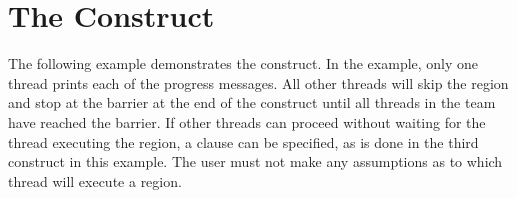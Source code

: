 \pagebreak
\chapter{The  Construct}
\label{chap:single}

The following example demonstrates the  construct. In the example, 
only one thread prints each of the progress messages. All other threads will skip 
the  region and stop at the barrier at the end of the  
construct until all threads in the team have reached the barrier. If other threads 
can proceed without waiting for the thread executing the  region, 
a  clause can be specified, as is done in the third  
construct in this example. The user must not make any assumptions as to which thread 
will execute a  region.




